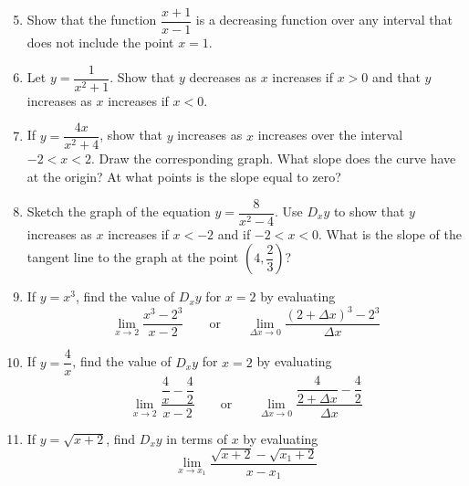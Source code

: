 \documentclass{report}
\begin{document}
\begin{enumerate}
      \setcounter{enumi}{4}
      \item Show that the function $\dfrac{x+1}{x-1}$ is a decreasing function over any
            interval that does not include the point $x = 1$.
      \item Let $y = \dfrac{1}{x^2 + 1}$. Show that $y$ decreases as $x$ increases if $x >
                  0$ and that $y$ increases as $x$ increases if $x < 0$.
      \item If $y = \dfrac{4x}{x^2 + 4}$, show that $y$ increases as $x$ increases over the
            interval $-2 < x < 2$. Draw the corresponding graph. What slope does the curve
            have at the origin? At what points is the slope equal to zero?
      \item Sketch the graph of the equation $y = \dfrac{8}{x^2 - 4}$. Use $D_x y$ to show
            that $y$ increases as $x$ increases if $x < -2$ and if $-2 < x < 0$. What is
            the slope of the tangent line to the graph at the point $\left(4,
                  \dfrac{2}{3}\right)$?
      \item If $y = x^3$, find the value of $D_x y$ for $x = 2$ by evaluating \[\lim\limits_{x \to 2}\dfrac{x^3 - 2^3}{x-2} \qquad \text{or} \qquad \lim\limits_{\Delta x \to 0}\dfrac{(2 + \Delta x)^3 - 2^3}{\Delta x}\]
      \item If $y = \dfrac{4}{x}$, find the value of $D_x y$ for $x = 2$ by evaluating \[\lim\limits_{x \to 2}\dfrac{\dfrac{4}{x} - \dfrac{4}{2}}{x-2} \qquad \text{or} \qquad \lim\limits_{\Delta x \to 0}\dfrac{\dfrac{4}{2 + \Delta x} - \dfrac{4}{2}}{\Delta x}\]
      \item If $y = \sqrt{x + 2}$, find $D_x y$ in terms of $x$ by evaluating \[\lim\limits_{x \to x_1}\dfrac{\sqrt{x + 2} - \sqrt{x_1 + 2}}{x - x_1}\]

\end{enumerate}
\end{document}
